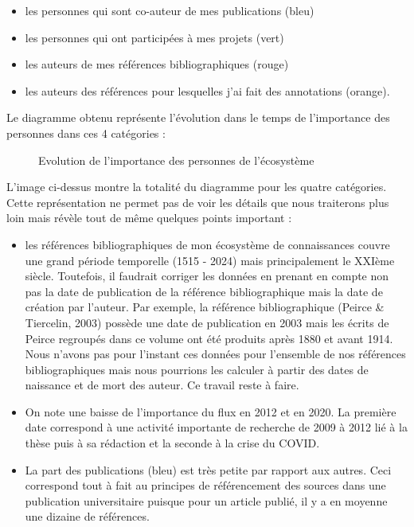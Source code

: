 \documentclass[
  a4paper,
  DIV=11,
  numbers=noendperiod]{scrreprt}
\begin{document}
\begin{itemize}
\item
  les personnes qui sont co-auteur de mes publications (bleu)
\item
  les personnes qui ont participées à mes projets (vert)
\item
  les auteurs de mes références bibliographiques (rouge)
\item
  les auteurs des références pour lesquelles j'ai fait des annotations
  (orange).
\end{itemize}

Le diagramme obtenu représente l'évolution dans le temps de l'importance
des personnes dans ces 4 catégories :

\begin{figure}


\caption{\label{fig-wordstreamTot}Evolution de l'importance des
personnes de l'écosystème}

\end{figure}%

L'image ci-dessus montre la totalité du diagramme pour les quatre
catégories. Cette représentation ne permet pas de voir les détails que
nous traiterons plus loin mais révèle tout de même quelques points
important :

\begin{itemize}
\item
  les références bibliographiques de mon écosystème de connaissances
  couvre une grand période temporelle (1515 - 2024) mais principalement
  le XXIème siècle. Toutefois, il faudrait corriger les données en
  prenant en compte non pas la date de publication de la référence
  bibliographique mais la date de création par l'auteur. Par exemple, la
  référence bibliographique (Peirce \& Tiercelin, 2003) possède une date
  de publication en 2003 mais les écrits de Peirce regroupés dans ce
  volume ont été produits après 1880 et avant 1914. Nous n'avons pas
  pour l'instant ces données pour l'ensemble de nos références
  bibliographiques mais nous pourrions les calculer à partir des dates
  de naissance et de mort des auteur. Ce travail reste à faire.
\item
  On note une baisse de l'importance du flux en 2012 et en 2020. La
  première date correspond à une activité importante de recherche de
  2009 à 2012 lié à la thèse puis à sa rédaction et la seconde à la
  crise du COVID.
\item
  La part des publications (bleu) est très petite par rapport aux
  autres. Ceci correspond tout à fait au principes de référencement des
  sources dans une publication universitaire puisque pour un article
  publié, il y a en moyenne une dizaine de références.
\end{itemize}
\end{document}
